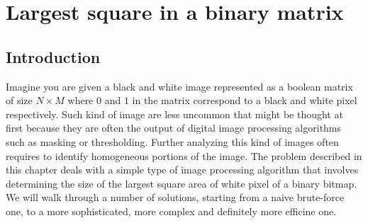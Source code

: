 %

\chapter{Largest square in a binary matrix}
\label{ch:square_in_matrix}
\section*{Introduction}
Imagine you are given a black and white image represented as a boolean matrix of size $N\times M$
where $0$ and $1$ in the matrix correspond to a black and white pixel respectively. Such kind of
image are less uncommon that might be thought at first because they are often the output of digital
image processing algorithms such as masking or thresholding. Further analyzing this kind of images
often requires to identify homogeneous portions of the image. The problem described in this chapter
deals with a simple type of image processing algorithm that involves determining the size of the
largest square area of white pixel of a binary bitmap. We will walk through a number of solutions,
starting from a naive brute-force one, to a more sophisticated, more complex and definitely more
efficine one.
 

